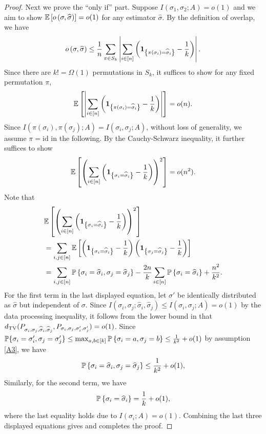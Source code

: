 \begin{proof}
Next we prove the ``only if'' part.
Suppose $I(\sigma_1, \sigma_2; A) = o(1)$ and we aim to show 
$\mathbb{E}\left[ o\left(\sigma, \widehat{\sigma} \right) \right]=o(1)$ for any estimator $\hat\sigma$.
By the definition of overlap, we have
\begin{align*}
o\left(\sigma, \widehat{\sigma} \right) 
\le 
\frac{1}{n} \sum_{\pi \in S_k}
\left| \sum_{i \in [n] }  
\left( {\mathbf{1}_{\left\{{ \pi\left(\sigma_i \right) = \widehat{\sigma}_i}\right\}}} - \frac{1}{k}  \right) \right|.
\end{align*}
Since there are $k!=\Omega(1)$ permutations in $S_k$, it suffices to show
for any fixed permutation $\pi$,
$$
\mathbb{E}\left[  \left| \sum_{i \in [n] } \left( {\mathbf{1}_{\left\{{ \pi\left(\sigma_i \right) = \widehat{\sigma}_i}\right\}}} - \frac{1}{k}  \right) 
\right|  \right] = o(n).
$$
Since $I(\pi(\sigma_i), \pi(\sigma_j); A)=I(\sigma_i, \sigma_j; A)$, without loss of generality, 
we assume $\pi=\text{id}$ in the following. By the Cauchy-Schwarz inequality, it further suffices to show
\begin{equation}
\mathbb{E}\left[  \left( \sum_{i \in [n] } \left( {\mathbf{1}_{\left\{{ \sigma_i =\widehat{\sigma}_i }\right\}}} - \frac{1}{k} \right)\right)^2  \right] =o(n^2).
\label{eq:overlap2}
\end{equation}
Note that 
\begin{align*}
& \mathbb{E}\left[   \left( \sum_{i \in [n] } \left(
   {\mathbf{1}_{\left\{{ \sigma_i  = \widehat{\sigma}_i }\right\}}} - \frac{1}{k} \right)   \right)^2  \right] \\
 & = \sum_{i, j \in [n] } 
 \mathbb{E}\left[  \left( {\mathbf{1}_{\left\{{ \sigma_i = \widehat{\sigma}_i }\right\}}}- \frac{1}{k}  \right) 
 \left( {\mathbf{1}_{\left\{{ \sigma_j  = \widehat{\sigma}_j }\right\}}}- \frac{1}{k}  \right)  \right]  \\
 & =  \sum_{i, j \in [n] }  \mathbb{P}\left\{   \sigma_i = \widehat{\sigma}_i , \sigma_j  = \widehat{\sigma}_j  \right\}
 - \frac{2n}{k} \sum_{i \in [n] }\mathbb{P}\left\{  \sigma_i = \widehat{\sigma}_i  \right\} + \frac{n^2}{k^2}.
\end{align*}
For the first term in the last displayed equation, 
let $\sigma'$ be identically distributed as $\hat\sigma$ but independent of $\sigma$.
Since $I(\sigma_i,\sigma_j;\hat\sigma_i,\hat\sigma_j) \le I(\sigma_i,\sigma_j;A)=o(1)$ by the data processing inequality, it follows from the lower bound in 
 that $d_{\rm TV}(P_{\sigma_i,\sigma_j,\widehat\sigma_i,\widehat\sigma_j}, P_{\sigma_i,\sigma_j,\sigma_i',\sigma_j'})=o(1)$.
Since 
$\mathbb{P}\{   \sigma_i = {\sigma}_i', \sigma_j  = {\sigma}_j'  \} \leq 
\max_{a,b \in [k]} \mathbb{P}\left\{   \sigma_i = a, \sigma_j  = b \right\} \leq \frac{1}{k^2}+o(1)$ by assumption \ref{A3}, 
we have
$$
\mathbb{P}\left\{   \sigma_i = \widehat{\sigma}_i , \sigma_j  = \widehat{\sigma}_j  \right\}
\leq \frac{1}{k^2} + o(1),
$$
Similarly, for the second term, we have
$$
\mathbb{P}\left\{  \sigma_i = \widehat{\sigma}_i  \right\} = \frac{1}{k} +o(1),
$$
where the last equality holds due to $I(\sigma_i; A) =o(1).$
Combining the last three displayed equations gives  and completes the proof.
\end{proof}


